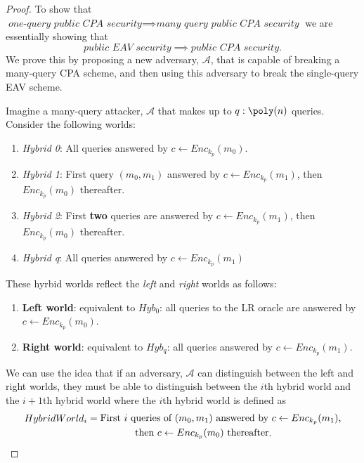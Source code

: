 \begin{proof}
	To show that \(\textit{one-query public CPA security} \implies \textit{many query public CPA security}\) we are essentially showing that
	\[
		\textit{public EAV security} \implies \textit{public CPA security}.
	\]
	We prove this by proposing a new adversary, \(\mathcal{A} \), that is capable of breaking a many-query CPA scheme, and then using this adversary to break the single-query EAV scheme. \par

	Imagine a many-query attacker, \(\mathcal{A} \) that makes up to \(q: \poly (n)\) queries. Consider the following worlds:
	\begin{enumerate}[label=(\roman*)]
		\item \emph{Hybrid 0}: All queries answered by \(c \gets Enc_{k_p}(m_0)\).
		\item \emph{Hybrid 1}: First query \((m_0, m_1)\) answered by \(c \gets Enc_{k_p}(m_1)\), then \(Enc_{k_p}(m_0)\) thereafter.
		\item \emph{Hybrid 2}: First \textbf{two} queries are answered by \(c \gets Enc_{k_p}(m_1)\), then \(Enc_{k_p}(m_0)\) thereafter.
		\item \emph{Hybrid q}: All queries answered by \(c \gets Enc_{k_p}(m_1)\) 
	\end{enumerate}

	These hyrbid worlds reflect the \emph{left} and \emph{right} worlds as follows:
	\begin{enumerate}[label=(\roman*)]
		\item \textbf{Left world}: equivalent to \(Hyb_0\): all queries to the LR oracle are answered by \(c \gets Enc_{k_p}(m_0)\).
		\item \textbf{Right world}: equivalent to \(Hyb_q\): all queries answered by \(c \gets Enc_{k_p}(m_1)\).
	\end{enumerate}

	We can use the idea that if an adversary, \(\mathcal{A} \) can distinguish between the left and right worlds, they must be able to distinguish between the \(i\)th hybrid world and the \(i+1\)th hybrid world where the \(i\)th hybrid world is defined as
	\begin{align*}
		HybridWorld_i &= \vcenter{\hbox{First $i$ queries of $(m_0, m_1)$ answered by $c \gets Enc_{k_p}(m_1)$,}} \\
		&\quad \vcenter{\hbox{\: \: \: \: \: \: \: then $c \gets Enc_{k_p}(m_0)$ thereafter}}.
	\end{align*}
	

\end{proof}
